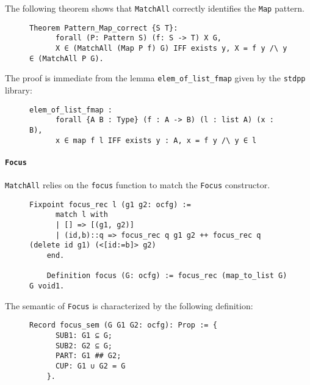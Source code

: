 \documentclass[11pt]{article}
\newcommand{\inlinecoq}[1]{\mbox{\lstinline[style=customcoq,columns=fixed,basewidth=.48em]{#1}}}
\newcommand{\ilc}[1]{\inlinecoq{#1}}
\begin{document}
The following theorem shows that \ilc{MatchAll} correctly identifies the \ilc{Map} pattern.

\begin{figure}[H]
  \label{fig:sem_when}
  \begin{lstlisting}[style=customcoq,basicstyle=\small\ttfamily]
    Theorem Pattern_Map_correct {S T}:
      forall (P: Pattern S) (f: S -> T) X G,
      X ∈ (MatchAll (Map P f) G) IFF exists y, X = f y /\ y ∈ (MatchAll P G).
  \end{lstlisting}
\end{figure}

The proof is immediate from the lemma \ilc{elem_of_list_fmap} given by the \ilc{stdpp} library:

\begin{figure}[H]
  \label{fig:list_fmap}
  \begin{lstlisting}[style=customcoq,basicstyle=\small\ttfamily]
    elem_of_list_fmap :
      forall {A B : Type} (f : A -> B) (l : list A) (x : B),
      x ∈ map f l IFF exists y : A, x = f y /\ y ∈ l
  \end{lstlisting}
\end{figure}

\paragraph{\ilc{Focus}}

\ilc{MatchAll} relies on the \ilc{focus} function to match the \ilc{Focus} constructor.

\begin{figure}[H]
  \label{fig:fun_focus}
  \begin{lstlisting}[style=customcoq,basicstyle=\small\ttfamily]
    Fixpoint focus_rec l (g1 g2: ocfg) :=
      match l with
      | [] => [(g1, g2)]
      | (id,b)::q => focus_rec q g1 g2 ++ focus_rec q (delete id g1) (<[id:=b]> g2)
    end.

    Definition focus (G: ocfg) := focus_rec (map_to_list G) G void1.
  \end{lstlisting}
\end{figure}

The semantic of \ilc{Focus} is characterized by the following definition:

\begin{figure}[H]
  \label{fig:sem_focus_def}
  \begin{lstlisting}[style=customcoq,basicstyle=\small\ttfamily]
    Record focus_sem (G G1 G2: ocfg): Prop := {
      SUB1: G1 ⊆ G;
      SUB2: G2 ⊆ G;
      PART: G1 ## G2;
      CUP: G1 ∪ G2 = G
    }.
  \end{lstlisting}
\end{figure}
\end{document}

